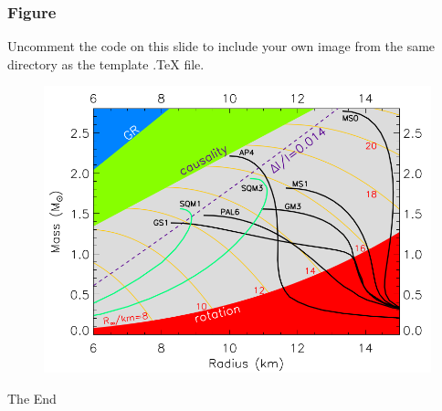 \documentclass{beamer}
\begin{document}
\begin{frame}
\frametitle{Figure}
Uncomment the code on this slide to include your own image from the same directory as the template .TeX file.
\begin{figure}
\includegraphics[width=0.8\linewidth]{eos_mr.png}
\end{figure}
\end{frame}


\fi





\begin{frame}
\Huge{\centerline{The End}}
\end{frame}

\end{document}
